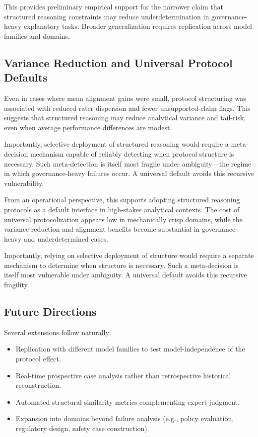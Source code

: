 This provides preliminary empirical support for the narrower claim that structured reasoning constraints may reduce underdetermination in governance-heavy explanatory tasks. Broader generalization requires replication across model families and domains.

\subsection{Variance Reduction and Universal Protocol Defaults}

Even in cases where mean alignment gains were small, protocol structuring was associated with reduced rater dispersion and fewer unsupported-claim flags. This suggests that structured reasoning may reduce analytical variance and tail-risk, even when average performance differences are modest.

Importantly, selective deployment of structured reasoning would require a meta-decision mechanism capable of reliably detecting when protocol structure is necessary. Such meta-detection is itself most fragile under ambiguity—the regime in which governance-heavy failures occur. A universal default avoids this recursive vulnerability.

From an operational perspective, this supports adopting structured reasoning protocols as a default interface in high-stakes analytical contexts. The cost of universal protocolization appears low in mechanically crisp domains, while the variance-reduction and alignment benefits become substantial in governance-heavy and underdetermined cases.

Importantly, relying on selective deployment of structure would require a separate mechanism to determine when structure is necessary. Such a meta-decision is itself most vulnerable under ambiguity. A universal default avoids this recursive fragility.
\subsection{Future Directions}

Several extensions follow naturally:

\begin{itemize}
    \item Replication with different model families to test model-independence of the protocol effect.
    \item Real-time prospective case analysis rather than retrospective historical reconstruction.
    \item Automated structural similarity metrics complementing expert judgment.
    \item Expansion into domains beyond failure analysis (e.g., policy evaluation, regulatory design, safety case construction).
\end{itemize}

